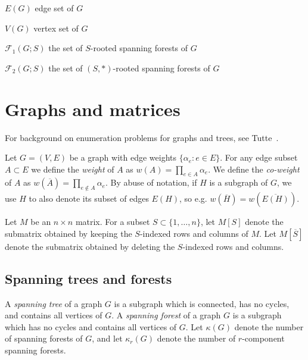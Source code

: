 \documentclass{amsart}
\theoremstyle{definition}
\newcommand{\RR}{\mathbb{R}}
\newcommand{\trees}{\mathcal{F}_1}
\newcommand{\forests}{\mathcal{F}}
\newcommand{\coweight}[1]{w(\overline{#1})}
\newcommand{\note}[1]{{\color{red} \sf $\diamondsuit$  {#1} $\diamondsuit$ }}
\begin{document}
$E(G)$ edge set of $G$

$V(G)$ vertex set of $G$




%

$\trees(G;S)$ the set of $S$-rooted spanning forests of $G$

$\forests_2(G;S)$ the set of $(S,*)$-rooted spanning forests of $G$


\section{Graphs and matrices}
\label{sec:graphs-matrices}

For background on enumeration problems for graphs and trees, 
see 
Tutte~\cite[Chapter VI]{tutte}. 

Let $G = (V, E)$ be a graph with edge weights $\{ \alpha_e : e \in E\}$.
For any edge subset $A \subset E$ we define the {\em weight} of $A$ as
$\displaystyle
	w(A) = \prod_{e \in A} \alpha_e.
$
We define the {\em co-weight} of $A$ as
$\displaystyle
	w(\overline A) = \prod_{e \not\in A} \alpha_e.
$
By abuse of notation, if $H$ is a subgraph of $G$, we use $H$ to also denote its subset of edges $E(H)$, so e.g. $\coweight{H} = \coweight{E(H)}$.

Let $M$ be an $n \times n$ matrix.
For a subset $S \subset \{1, \ldots, n\}$, 
let $M[S]$ denote the submatrix obtained by keeping the $S$-indexed rows and columns of $M$.
Let $M[\overline{S}]$ denote the submatrix obtained by deleting the $S$-indexed rows and columns.

\subsection{Spanning trees and forests}
A {\em spanning tree} of a graph $G$ is a subgraph which 
is connected, has no cycles,
and contains all vertices of $G$.
A {\em spanning forest} of a graph $G$ is a subgraph which 
has no cycles
and 
contains all vertices of $G$. 
Let $\kappa(G)$ denote the number of spanning forests of $G$, and let $\kappa_r(G)$ denote the number of $r$-component spanning forests.
\end{document}
